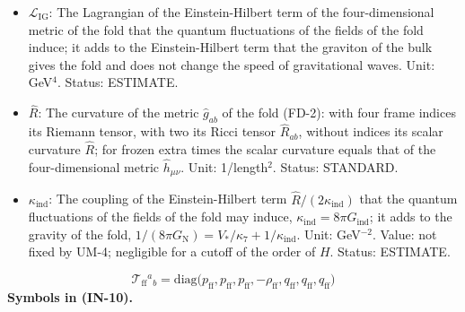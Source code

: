 \documentclass[
  10pt,
]{article}
\providecommand{\tightlist}{%
  \setlength{\itemsep}{0pt}\setlength{\parskip}{0pt}}
\begin{document}
\begin{itemize}
\tightlist
\item
  \(\mathcal{L}_{\mathrm{IG}}\): The Lagrangian of the Einstein-Hilbert
  term of the four-dimensional metric of the fold that the quantum
  fluctuations of the fields of the fold induce; it adds to the
  Einstein-Hilbert term that the graviton of the bulk gives the fold and
  does not change the speed of gravitational waves. Unit: GeV\(^4\).
  Status: ESTIMATE.
\item
  \(\hat R\): The curvature of the metric \(\hat g_{ab}\) of the fold
  (FD-2): with four frame indices its Riemann tensor, with two its Ricci
  tensor \(\hat R_{ab}\), without indices its scalar curvature
  \(\hat R\); for frozen extra times the scalar curvature equals that of
  the four-dimensional metric \(\hat h_{\mu\nu}\). Unit: 1/length\(^2\).
  Status: STANDARD.
\item
  \(\kappa_{\mathrm{ind}}\): The coupling of the Einstein-Hilbert term
  \(\hat R/(2\kappa_{\mathrm{ind}})\) that the quantum fluctuations of
  the fields of the fold may induce,
  \(\kappa_{\mathrm{ind}} = 8\pi G_{\mathrm{ind}}\); it adds to the
  gravity of the fold,
  \(1/(8\pi G_{\mathrm{N}}) = V_*/\kappa_7 + 1/\kappa_{\mathrm{ind}}\).
  Unit: GeV\(^{-2}\). Value: not fixed by UM-4; negligible for a cutoff
  of the order of \(H\). Status: ESTIMATE.
\end{itemize}

\[
\mathcal{T}_{\mathrm{ff}}{}^a{}_b = \mathrm{diag}\big(p_{\mathrm{ff}}, p_{\mathrm{ff}}, p_{\mathrm{ff}}, -\rho_{\mathrm{ff}},
 q_{\mathrm{ff}}, q_{\mathrm{ff}}, q_{\mathrm{ff}}\big) \tag{IN-10}
\] \textbf{Symbols in (IN-10).}
\end{document}
